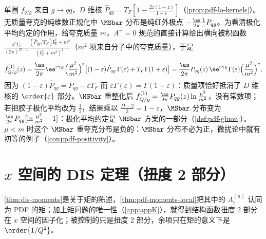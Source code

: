 \begin{example}[胶子中的夸克]\label{ex:pdf-quark-in-gluon}
单圈 $f_{q/g}$ 来自 $g\to q\bar q$，$D$ 维核 $\hat P_{qg}=T_F[1-\frac{2z(1-z)}{1-\varepsilon}]$（\cref{prop:pdf-lo-kernels}）。无质量夸克的纯维数正规化中 $\MSbar$ 分布是纯红外极点 $-\frac{\as}{2\pi}\frac1\varepsilon P_{qg}$。为看清极化平均约定的作用，给夸克质量 $m$，$A^+=0$ 规范的直接计算给出横向被积函数 $\frac{g^2T_F}{(2\pi)^{D-1}}\frac{(\hat P_{qg}/T_F)\bm l_{\mathrm T}^2+m^2}{(\bm l_{\mathrm T}^2+m^2)^2}$（$m^2$ 项来自分子中的夸克质量），于是
\[
f^{(1)}_{Q/g}(z)=\frac{\as}{2\pi}\ee^{\varepsilon\gamma_E}\Big(\frac{\mu^2}{m^2}\Big)^{\varepsilon}\big[(1-\varepsilon)\hat P_{qg}\,\Gamma(\varepsilon)+T_F\Gamma(1+\varepsilon)\big]
=\frac{\as}{2\pi}P_{qg}(z)\,\ee^{\varepsilon\gamma_E}\Gamma(\varepsilon)\Big(\frac{\mu^2}{m^2}\Big)^{\varepsilon},
\]
因为 $(1-\varepsilon)\hat P_{qg}=P_{qg}-\varepsilon T_F$ 而 $\varepsilon\Gamma(\varepsilon)=\Gamma(1+\varepsilon)$：质量项恰好抵消了 $D$ 维核的 $\order{\varepsilon}$ 部分。$\MSbar$ 重整化后 $f^{(1)}_{Q/g}=\frac{\as}{2\pi}P_{qg}(z)\ln\frac{\mu^2}{m^2}$，没有常数项；若把胶子极化平均改为 $\frac12$，结果乘以 $\frac{D-2}{2}=1-\varepsilon$，$\MSbar$ 分布变为 $\frac{\as}{2\pi}P_{qg}[\ln\frac{\mu^2}{m^2}-1]$：极化平均约定是 $\MSbar$ 方案的一部分（\cref{def:pdf-gluon}）。$\mu<m$ 时这个 $\MSbar$ 重夸克分布是负的：$\MSbar$ 分布不必为正，微扰论中就有初等的例子（\cref{conj:pdf-positivity}）。
\end{example}

\section{$x$ 空间的 DIS 定理（扭度 2 部分）}\label{sec:pdf-dis}

\cref{thm:dis-moments}是关于矩的陈述，\cref{thm:pdf-moments-local}把其中的 $A^{(n)}_i$ 认同为 PDF 的矩；加上矩问题的唯一性（\cref{app:appK}），就得到结构函数扭度 2 部分在 $x$ 空间的因子化；被控制的只是扭度 2 部分，余项只在矩的意义下是 $\order{1/Q^2}$。

